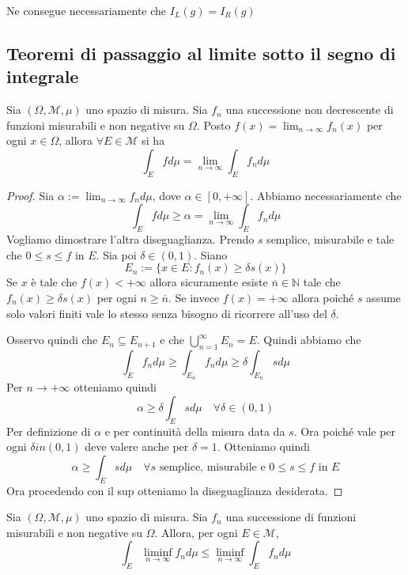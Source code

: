 Ne consegue necessariamente che \(I_L{(g)} = I_R{(g)}\) 

\subsection{Teoremi di passaggio al limite sotto il segno di integrale}
\begin{theorem}\label{th:beppo_levi_base}
Sia \((\Omega, \mathcal{M}, \mu)\) uno spazio di misura. Sia \(f_{n}\) una
successione non decrescente di funzioni misurabili e non negative su \(\Omega\).
Posto \(f(x) = \lim_{n \to \infty} f_{n}(x)\) per ogni \(x \in \Omega\), allora
\(\forall E \in \mathcal{M}\) si ha
\[
    \int_E f d\mu = \lim_{n \to \infty} \int_E f_{n} d\mu
\]
\end{theorem}
\begin{proof}
    Sia \(\alpha := \lim_{n \to \infty} f_{n} d\mu\), dove \(\alpha \in [0,
    +\infty]\). Abbiamo necessariamente che 
    \[
        \int_E f d\mu \ge \alpha = \lim_{n \to \infty} \int_E f_{n} d\mu
    \]
    Vogliamo dimostrare l'altra diseguaglianza. Prendo \(s\) semplice,
    misurabile e tale che \(0 \le s \le f\) in \(E\). Sia poi \(\delta \in (0,
    1)\). Siano 
    \[
        E_{n} := \{ x \in E : f_{n}(x) \ge \delta s(x)\} 
    \]
    Se \(x\) è tale che \(f(x) < +\infty\) allora sicuramente esiste
    \(\overline{n} \in \mathbb{N}\) tale che \(f_{n}(x) \ge \delta s(x)\) per
    ogni \(n \ge \overline{n}\). Se invece \(f(x) = +\infty\) allora poiché
    \(s\) assume solo valori finiti vale lo stesso senza bisogno di ricorrere
    all'uso del \(\delta\).

    Osservo quindi che \(E_{n} \subseteq E_{n+1}\) e che \(\bigcup_{n=1}^{\infty} E_{n}
    = E\). Quindi abbiamo che
    \[
        \int_E f_{n} d\mu \ge \int_{E_{n}} f_{n} d\mu \ge \delta \int_{E_{n}} s
        d\mu
    \]
    Per \(n \to +\infty\) otteniamo quindi
    \[
        \alpha \ge \delta \int_E s d\mu \quad \forall \delta \in (0, 1)
    \]
    Per definizione di \(\alpha\) e per continuità della misura data da \(s\).
    Ora poiché vale per ogni \(\delta in (0, 1)\) deve valere anche per \(\delta
    = 1\). Otteniamo quindi
    \[
        \alpha \ge \int_E s d\mu \quad \forall s \text{ semplice, misurabile e }
        0 \le s \le f \text{ in } E
    \]
    Ora procedendo con il sup otteniamo la diseguaglianza desiderata.
\end{proof}
\begin{lemmao}\label{le:fatou_base}
    Sia \((\Omega, \mathcal{M}, \mu)\) uno spazio di misura. Sia \(f_{n}\) una
    successione di funzioni misurabili e non negative su \(\Omega\). Allora, per
    ogni \(E \in \mathcal{M}\),
    \[
        \int_E \liminf_{n \to \infty} f_{n} d\mu \le \liminf_{n \to \infty}
        \int_E f_{n} d\mu
    \]
\end{lemmao}
